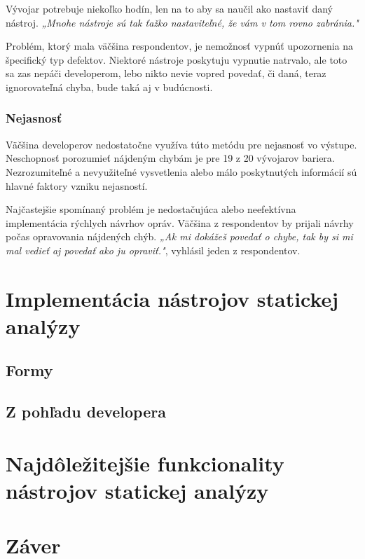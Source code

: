 \documentclass[11pt,twoside,slovak,a4paper]{article}
\begin{document}
Vývojar potrebuje niekoľko hodín, len na to aby sa naučil ako nastaviť daný nástroj. \emph{„Mnohe nástroje sú tak ťažko nastaviteľné, že vám v tom rovno zabránia."}

Problém, ktorý mala väčšina respondentov, je nemožnosť vypnúť upozornenia na špecifický typ defektov. Niektoré nástroje
poskytuju vypnutie natrvalo, ale toto sa zas nepáči developerom, lebo nikto nevie vopred povedať, či daná, teraz
ignorovateľná chyba, bude taká aj v budúcnosti.

\subsubsection*{Nejasnosť}
Väčšina developerov nedostatočne využíva túto metódu pre nejasnosť vo výstupe. Neschopnosť porozumieť nájdeným chybám
je pre 19 z 20 vývojarov bariera. Nezrozumiteľné a nevyužiteľné vysvetlenia alebo málo poskytnutých informácií sú hlavné
faktory vzniku nejasností.

Najčastejšie spomínaný problém je nedostačujúca alebo neefektívna implementácia rýchlych návrhov opráv. Väčšina z
respondentov by prijali návrhy počas opravovania nájdených chýb. \emph{„Ak mi dokážeš povedať o chybe, tak by si mi mal
	vedieť aj povedať ako ju opraviť."}, vyhlásil jeden z respondentov.

\section{Implementácia nástrojov statickej analýzy} \label{implementacia}
\subsection{Formy}\label{implementacia:formy}
\subsection{Z pohľadu developera}\label{implementacia:dev}

\section{Najdôležitejšie funkcionality nástrojov statickej analýzy} \label{funkcionality}

\section{Záver}
\end{document}
